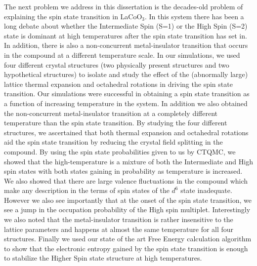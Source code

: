 \documentclass[10pt]{ruthesis}
\begin{document}
{The next problem we address in this dissertation is the decades-old problem of explaining the spin state transition in LaCoO$_3$. In this system there has been a long debate about whether the Intermediate Spin (S=1) or the High Spin (S=2) state is dominant at high temperatures after the spin state transition has set in. In addition, there is also a non-concurrent metal-insulator transition that occurs in the compound at a different temperature scale. In our simulations, we used four different crystal structures (two physically present structures and two hypothetical structures) to isolate and study the effect of the (abnormally large) lattice thermal expansion and octahedral rotations in driving the spin state transition. Our simulations were successful in obtaining a spin state transition as a function of increasing temperature in the system. In addition we also obtained the non-concurrent metal-insulator transition at a completely different temperature than the spin state transition. By studying the four different structures, we ascertained that both thermal expansion and octahedral rotations aid the spin state transition by reducing the crystal field splitting in the compound. By using the spin state probabilities given to us by CTQMC, we showed that the high-temperature is a mixture of both the Intermediate and High spin states with both states gaining in probability as temperature is increased. We also showed that there are large valence fluctuations in the compound which make any description in the terms of spin states of the $d^6$ state inadequate. However we also see importantly that at the onset of the spin state transition, we see a jump in the occupation probability of the High spin multiplet. Interestingly we also noted that the metal-insulator transition is rather insensitive to the lattice parameters and happens at almost the same temperature for all four structures. Finally we used our state of the art Free Energy calculation algorithm to show that the electronic entropy gained by the spin state transition is enough to stabilize the Higher Spin state structure at high temperatures. 

}
\end{document}
